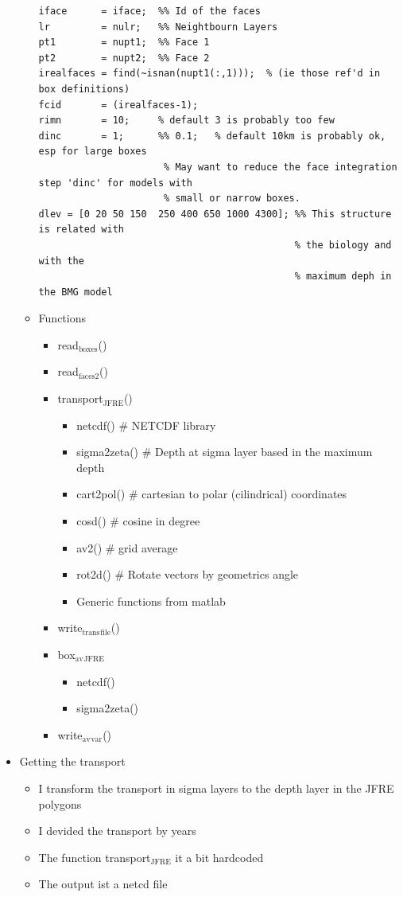\documentclass[11pt]{article}
\begin{document}
\begin{itemize}
\begin{itemize}
\begin{verbatim}
iface      = iface;  %% Id of the faces
lr         = nulr;   %% Neightbourn Layers
pt1        = nupt1;  %% Face 1
pt2        = nupt2;  %% Face 2
irealfaces = find(~isnan(nupt1(:,1)));  % (ie those ref'd in box definitions)
fcid       = (irealfaces-1);
rimn       = 10;     % default 3 is probably too few
dinc       = 1;      %% 0.1;   % default 10km is probably ok, esp for large boxes
                      % May want to reduce the face integration step 'dinc' for models with
                      % small or narrow boxes.
dlev = [0 20 50 150  250 400 650 1000 4300]; %% This structure is related with
                                             % the biology and with the
                                             % maximum deph in the BMG model
\end{verbatim}


\item Functions
\label{sec-4-3-2-2-2-2}%
\begin{itemize}
\item read$_{\mathrm{boxes}}$()
\item read$_{\mathrm{faces2}}$()
\item transport$_{\mathrm{JFRE}}$()
\begin{itemize}
\item netcdf()      \# NETCDF library
\item sigma2zeta()  \# Depth at sigma layer based in the maximum depth
\item cart2pol()    \# cartesian to polar (cilindrical) coordinates
\item cosd()        \# cosine in degree
\item av2()         \# grid average
\item rot2d()       \# Rotate vectors by geometrics angle
\item Generic functions from matlab
\end{itemize}
\item write$_{\mathrm{trans}}$$_{\mathrm{file}}$()
\item box$_{\mathrm{av}}$$_{\mathrm{JFRE}}$
\begin{itemize}
\item netcdf()
\item sigma2zeta()
\end{itemize}
\item write$_{\mathrm{av}}$$_{\mathrm{var}}$()
\end{itemize}
\end{itemize} %

\item Getting the transport
\label{sec-4-3-2-2-3}%
\begin{itemize}
\item I transform the transport in sigma layers to the depth layer in the JFRE polygons
\item I devided the transport by years
\item The function transport$_{\mathrm{JFRE}}$ it a bit hardcoded
\item The output ist a netcd file
\end{itemize}
\begin{itemize}


\end{itemize}
\end{itemize}
\end{document}
